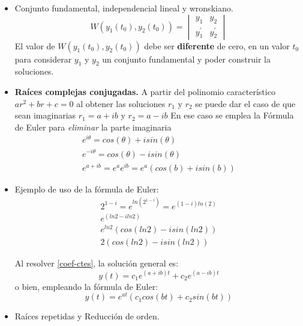 \documentclass[twoside, twocolumn, 10pt]{article}
\begin{document}
{\begin{small}
\begin{enumerate}
\begin{itemize}
        \textit{El múltiplo constante $y=c_{1}y_{1}(t)$ de una solución $y_{1}(t)$ de una ode lineal homogénea, es también una solución.}
    \item Conjunto fundamental, independencial lineal y wronskiano.
    \begin{equation}
          W(y_{1}(t_{0}),y_{2}(t_{0})) = \begin{vmatrix}
                                          y_{1} & y_{2}\\
                                          y_{1}^{\prime} & y_{2}^{\prime}
                           \end{vmatrix}                           
    \end{equation}
    El valor de $W(y_{1}(t_{0}),y_{2}(t_{0}))$ debe ser \textbf{diferente} de cero, en un valor $t_{0}$ para considerar $y_{1}$ y $y_{2}$ un conjunto fundamental y poder construir
    la soluciones. 
    \item \textbf{Raíces complejas conjugadas.}
    A partir del polinomio característico
    $ar^{2} + br + c = 0$ al obtener las soluciones $r_{1}$ y $r_{2}$ se puede dar el caso de que sean imaginarias
    $r_{1} = a + ib$ y  $r_{2} = a - ib$
    En ese caso se emplea la Fórmula de Euler para \textit{eliminar} la parte imaginaria
    \begin{align*}
    e^{i\theta} = cos(\theta) + isin(\theta)\\
    e^{-i\theta} = cos(\theta) - isin(\theta)\\
    e^{a + ib} = e^{a}e^{ib}=e^{a}(cos(b) + i sin(b))    
    \end{align*}
    \item Ejemplo de uso de la fórmula de Euler:
    \begin{align*}
     2^{1-i} = e^{ln(2^{1-i})}=e^{(1-i)ln(2)}\\
     e^{(ln2 -iln2)}\\
     e^{ln2}(cos(ln2) - isin(ln2))\\
     2(cos(ln2) -isin(ln2))
    \end{align*}

    Al resolver \ref{coef-ctes}, la solución general es:
    \begin{equation}
    y(t) = c_{1}e^{(a+ib)t} + c_{2}e^{(a-ib)t}
    \end{equation}
    o bien, empleando la fórmula de Euler:
    \begin{equation}
     y(t) = e^{at}(c_{1} cos(bt) + c_{2} sin(bt))
    \end{equation}
    \item Raíces repetidas y Reducción de orden.
    

\end{itemize}
\end{enumerate}
\end{small}}
\end{document}
